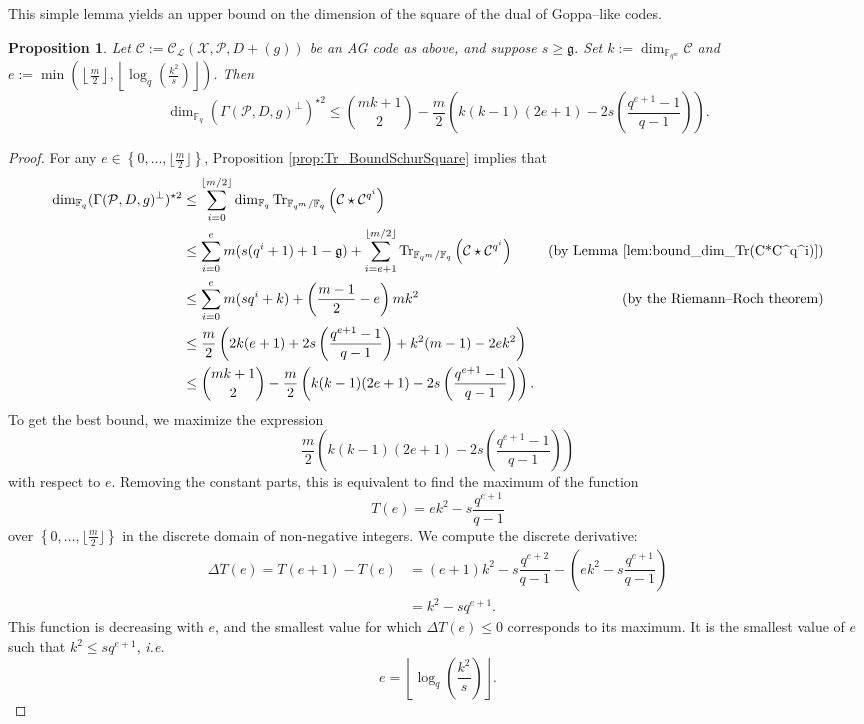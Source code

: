 \documentclass[a4paper]{amsart}
\newtheorem{proposition}[thm]{Proposition}
\theoremstyle{definition}
\theoremstyle{remark}
\newcommand{\calP}{\mathcal{P}}
\newcommand{\calL}{\mathcal{L}}
\newcommand{\calC}{\mathcal{C}}
\newcommand{\calX}{\mathcal{X}}
\newcommand{\fqm}{\mathbb{F}_{q^m}}
\newcommand{\fq}{\mathbb{F}_{q}}
\newcommand{\Tr}[1]{\operatorname{Tr}_{\mathbb{F}_{q^m}/\fq}\left(#1\right)}
\newcommand{\set}[1]{\left\{#1\right\}}
\begin{document}
This simple lemma yields an upper bound on the dimension of the square of the dual of Goppa--like codes.
\begin{proposition} \label{prop:bound_dim_using_inclusions}
    Let $\calC := \calC_{\calL}(\calX,\calP,D+(g))$ be an AG code as above, and suppose $s \geq \mathfrak{g}$. Set $k := \dim_{\fqm}\calC$ and  $e := \min\left(\left\lfloor \frac{m}{2} \right\rfloor,\left\lfloor \log_q\left(\frac{k^2}{s}\right)\right\rfloor\right)$. Then
    $$\dim_{\fq} (\Gamma(\calP,D,g)^{\perp})^{\star 2} \leq \binom{mk+1}{2} - \dfrac{m}{2}\left(k(k-1)(2e+1)-2s\left(\dfrac{q^{e+1}-1}{q-1}\right)\right).$$
\end{proposition}
\begin{proof}
 For any $e \in \set{0,\dots,\lfloor \frac{m}{2} \rfloor}$, Proposition \ref{prop:Tr_BoundSchurSquare} implies that
    \begin{align*}
        \dim_{\fq}(\Gamma(\calP,D,g)^{\perp})^{\star 2}
        & \leq \sum\limits_{i=0}^{\lfloor m/2 \rfloor} \dim_{\fq} \Tr{\calC \star \calC^{q^i}} &\\
        & \leq \sum\limits_{i=0}^{e} m(s(q^i+1)+1-\mathfrak{g})  + \sum\limits_{i=e+1}^{\lfloor m/2 \rfloor} \Tr{\calC \star \calC^{q^i}} & \text{(by Lemma \ref{lem:bound_dim_Tr(C*C^q^i)})}\\
        & \leq \sum\limits_{i=0}^{e} m(sq^i+k) + \left( \frac{m-1}{2} -e \right)mk^2 & \text{(by the Riemann--Roch theorem)}\\
        & \leq \frac{m}{2}\left(2k(e+1)+2s\left(\dfrac{q^{e+1}-1}{q-1}\right)+k^2(m-1)-2ek^2  \right) &\\
        & \leq \binom{mk+1}{2} -  \dfrac{m}{2}\left(k(k-1)(2e+1)-2s\left(\dfrac{q^{e+1}-1}{q-1}\right)\right).&
    \end{align*}
To get the best bound, we maximize the expression $$ \dfrac{m}{2}\left(k(k-1)(2e+1)-2s\left(\dfrac{q^{e+1}-1}{q-1}\right)\right)$$ with respect to $e$. Removing the constant parts, this is equivalent to find the maximum of the function
$$T(e) = ek^2-s\dfrac{q^{e+1}}{q-1}$$
over $\set{0,\dots,\lfloor \frac{m}{2} \rfloor}$ in the discrete domain of non-negative integers.  
We compute the discrete derivative:
\begin{align*}
    \Delta T(e) = T(e+1)-T(e) &= (e+1)k^2-s\dfrac{q^{e+2}}{q-1} - \left(ek^2-s\dfrac{q^{e+1}}{q-1}\right) \\
                              &= k^2 - sq^{e+1}.
\end{align*}
This function is decreasing with $e$, and the smallest value for which $\Delta T(e) \leq 0$ corresponds to its maximum. It is the smallest value of $e$ such that $k^2 \leq sq^{e+1}$, \emph{i.e.}
$$e =  \left\lfloor \log_q\left(\dfrac{k^2}{s}\right)\right\rfloor.$$
\end{proof}
\end{document}

